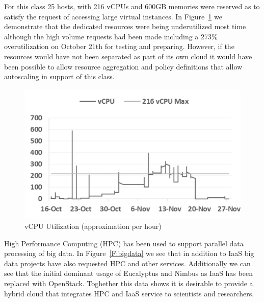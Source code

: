 \documentclass{sig-alternate-05-2015}
\begin{document}
For this class 25 hosts, with 216 vCPUs and 600GB memories were reserved as to satisfy the request of accessing large virtual instances. In Figure~\ref{F:fig6} we demonstrate that the dedicated resources were being underutilized most time although the high volume requests had been made including a 273\% overutilization on October 21th for testing and preparing. However, if the resources would have not been separated as part of its own cloud it would have been possible to allow resource aggregation and policy definitions that allow autoscaling in support of this class.
  
\begin{figure}[htb] 
  \centering 
    \includegraphics[width=1.0\columnwidth]{images/fig5.pdf} 
  \caption{vCPU Utilization (approximation per hour)}\label{F:fig6} 
\end{figure} 

High Performance Computing (HPC) has been used to support parallel data processing of big data. In Figure~\ref{F:bigdata} we see that in addition to IaaS big data projects have also requested HPC and other services. Additionally we can see that the initial dominant usage of Eucalyptus and Nimbus as IaaS has been replaced with OpenStack.  Toghether this data shows it is desirable to provide a hybrid cloud that integrates HPC and IaaS service to scientists and researchers.
\end{document}
